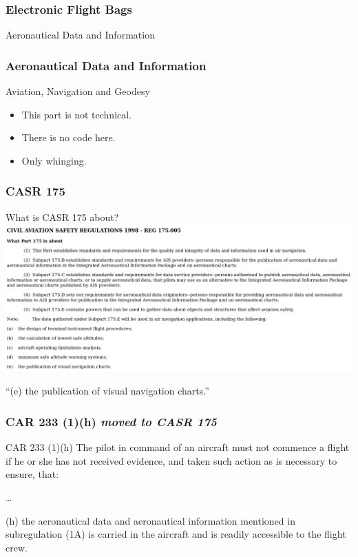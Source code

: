 \begin{frame}
\frametitle{Electronic Flight Bags}
\begin{center}
Aeronautical Data and Information
\end{center}
\end{frame}

\begin{frame}
\frametitle{Aeronautical Data and Information}
\begin{block}{Aviation, Navigation and Geodesy}
\begin{itemize}
\item<1-> This part is not technical.
\item<2-> There is no code here.
\item<3-> Only whinging.
\end{itemize}
\end{block}
\end{frame}

\begin{frame}
\frametitle{CASR 175}
\begin{block}{What is CASR 175 about?}
\includegraphics[height=0.5\textheight,natwidth=1857,natheight=791]{image/casr175_005.png}
\end{block}
\par
``(e) the publication of visual navigation charts.''
\end{frame}

\begin{frame}
\frametitle{CAR 233 (1)(h) \emph{moved to CASR 175}}
\scriptsize
\begin{block}{CAR 233 (1)(h)}
The pilot in command of an aircraft must not commence a flight if he or she has not received evidence, and taken such action as is necessary to ensure, that:
\par
\ldots
\par
(h)  the aeronautical data and aeronautical information mentioned in subregulation (1A) is carried in the aircraft and is readily accessible to the flight crew.
\end{block}
\par
\end{frame}


